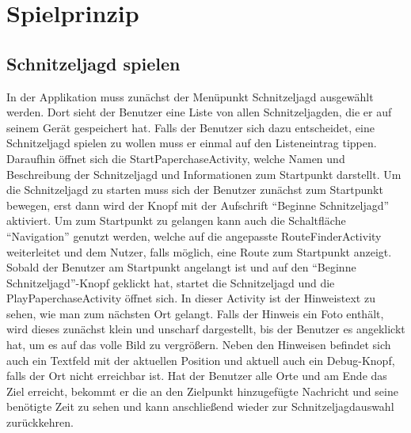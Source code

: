 \section{Spielprinzip}
\subsection{Schnitzeljagd spielen}
In der Applikation muss zunächst der Menüpunkt Schnitzeljagd ausgewählt werden. Dort sieht der Benutzer eine Liste von allen Schnitzeljagden, die er auf seinem Gerät gespeichert hat. Falls der Benutzer sich dazu entscheidet, eine Schnitzeljagd spielen zu wollen muss er einmal auf den Listeneintrag tippen. Daraufhin öffnet sich die StartPaperchaseActivity, welche Namen und Beschreibung der Schnitzeljagd und Informationen zum Startpunkt darstellt. Um die Schnitzeljagd zu starten muss sich der Benutzer zunächst zum Startpunkt bewegen, erst dann wird der Knopf mit der Aufschrift \enquote{Beginne Schnitzeljagd} aktiviert. Um zum Startpunkt zu gelangen kann auch die Schaltfläche \enquote{Navigation} genutzt werden, welche auf die angepasste RouteFinderActivity weiterleitet und dem Nutzer, falls möglich, eine Route zum Startpunkt anzeigt. Sobald der Benutzer am Startpunkt angelangt ist und auf den \enquote{Beginne Schnitzeljagd}-Knopf geklickt hat, startet die Schnitzeljagd und die PlayPaperchaseActivity öffnet sich. In dieser Activity ist der Hinweistext zu sehen, wie man zum nächsten Ort gelangt. Falls der Hinweis ein Foto enthält, wird dieses zunächst klein und unscharf dargestellt, bis der Benutzer es angeklickt hat, um es auf das volle Bild zu vergrößern. Neben den Hinweisen befindet sich auch ein Textfeld mit der aktuellen Position und aktuell auch ein Debug-Knopf, falls der Ort nicht erreichbar ist. Hat der Benutzer alle Orte und am Ende das Ziel erreicht, bekommt er die an den Zielpunkt hinzugefügte Nachricht und seine benötigte Zeit zu sehen und kann anschließend wieder zur Schnitzeljagdauswahl zurückkehren.


